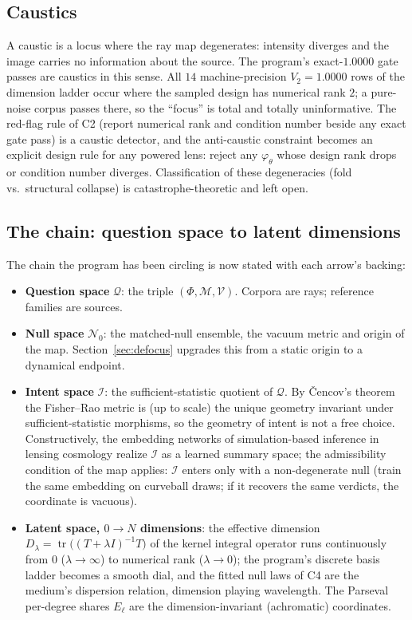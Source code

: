 \documentclass[11pt,a4paper]{article}
\theoremstyle{plain}
\theoremstyle{remark}
\begin{document}
\subsection{Caustics}
A caustic is a locus where the ray map degenerates: intensity diverges and the image carries no information about the source. The program's exact-$1.0000$ gate passes are caustics in this sense. All $14$ machine-precision $V_2=1.0000$ rows of the dimension ladder occur where the sampled design has numerical rank $2$; a pure-noise corpus passes there, so the ``focus'' is total and totally uninformative. The red-flag rule of C2 (report numerical rank and condition number beside any exact gate pass) is a caustic detector, and the anti-caustic constraint becomes an explicit design rule for any powered lens: reject any $\varphi_\theta$ whose design rank drops or condition number diverges. Classification of these degeneracies (fold vs.\ structural collapse) is catastrophe-theoretic and left open.

\subsection{The chain: question space to latent dimensions}
The chain the program has been circling is now stated with each arrow's backing:
\begin{itemize}
\item \textbf{Question space} $\mathcal Q$: the triple $(\Phi,\mathcal M,\mathcal V)$. Corpora are rays; reference families are sources.
\item \textbf{Null space} $\mathcal N_0$: the matched-null ensemble, the vacuum metric and origin of the map. Section~\ref{sec:defocus} upgrades this from a static origin to a dynamical endpoint.
\item \textbf{Intent space} $\mathcal I$: the sufficient-statistic quotient of $\mathcal Q$. By \v{C}encov's theorem the Fisher--Rao metric is (up to scale) the unique geometry invariant under sufficient-statistic morphisms, so the geometry of intent is not a free choice. Constructively, the embedding networks of simulation-based inference in lensing cosmology realize $\mathcal I$ as a learned summary space; the admissibility condition of the map applies: $\mathcal I$ enters only with a non-degenerate null (train the same embedding on curveball draws; if it recovers the same verdicts, the coordinate is vacuous).
\item \textbf{Latent space, $0\to N$ dimensions}: the effective dimension $D_\lambda=\operatorname{tr}\big((T+\lambda I)^{-1}T\big)$ of the kernel integral operator runs continuously from $0$ ($\lambda\to\infty$) to numerical rank ($\lambda\to0$); the program's discrete basis ladder becomes a smooth dial, and the fitted null laws of C4 are the medium's dispersion relation, dimension playing wavelength. The Parseval per-degree shares $E_\ell$ are the dimension-invariant (achromatic) coordinates.
\end{itemize}
\end{document}
